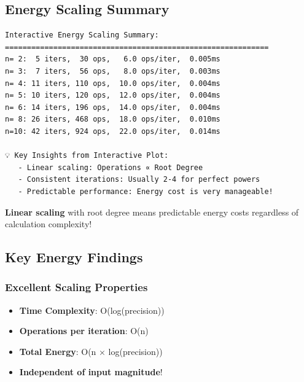 \documentclass[
  letterpaper,
  DIV=11,
  numbers=noendperiod]{scrartcl}
\providecommand{\tightlist}{%
  \setlength{\itemsep}{0pt}\setlength{\parskip}{0pt}}
\begin{document}
\subsection{Energy Scaling Summary}\label{energy-scaling-summary}

\begin{verbatim}
Interactive Energy Scaling Summary:
============================================================
n= 2:  5 iters,  30 ops,   6.0 ops/iter,  0.005ms
n= 3:  7 iters,  56 ops,   8.0 ops/iter,  0.003ms
n= 4: 11 iters, 110 ops,  10.0 ops/iter,  0.004ms
n= 5: 10 iters, 120 ops,  12.0 ops/iter,  0.004ms
n= 6: 14 iters, 196 ops,  14.0 ops/iter,  0.004ms
n= 8: 26 iters, 468 ops,  18.0 ops/iter,  0.010ms
n=10: 42 iters, 924 ops,  22.0 ops/iter,  0.014ms

💡 Key Insights from Interactive Plot:
   - Linear scaling: Operations ∝ Root Degree
   - Consistent iterations: Usually 2-4 for perfect powers
   - Predictable performance: Energy cost is very manageable!
\end{verbatim}

\begin{tcolorbox}[enhanced jigsaw, left=2mm, opacityback=0, breakable, toptitle=1mm, arc=.35mm, opacitybacktitle=0.6, colframe=quarto-callout-tip-color-frame, colback=white, coltitle=black, bottomrule=.15mm, title=\textcolor{quarto-callout-tip-color}{\faLightbulb}\hspace{0.5em}{Energy Efficiency Breakthrough!}, colbacktitle=quarto-callout-tip-color!10!white, bottomtitle=1mm, leftrule=.75mm, toprule=.15mm, rightrule=.15mm, titlerule=0mm]

{\textbf{Linear scaling}} with root degree means predictable energy
costs regardless of calculation complexity!

\end{tcolorbox}

\subsection{Key Energy Findings}\label{key-energy-findings}

\subsubsection{\texorpdfstring{\textbf{Excellent Scaling
Properties}}{Excellent Scaling Properties}}\label{excellent-scaling-properties}

\begin{itemize}
\tightlist
\item
  \textbf{Time Complexity}: O(log(precision))
\item
  \textbf{Operations per iteration}: O(n)
\item
  \textbf{Total Energy}: O(n × log(precision))
\item
  \textbf{Independent of input magnitude}!
\end{itemize}
\end{document}

